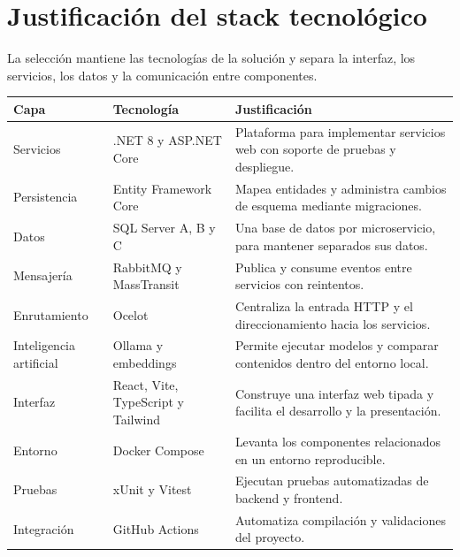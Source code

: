 \section{Justificación del stack tecnológico}
La selección mantiene las tecnologías de la solución y separa la interfaz, los servicios, los datos y la comunicación entre componentes.

\begin{tabularx}{\textwidth}{|p{}|p{}|X|}\hline
\rowcolor{grisTarjeta}\textbf{Capa} & \textbf{Tecnología} & \textbf{Justificación}\\\hline
Servicios & .NET 8 y ASP.NET Core & Plataforma para implementar servicios web con soporte de pruebas y despliegue.\\\hline
Persistencia & Entity Framework Core & Mapea entidades y administra cambios de esquema mediante migraciones.\\\hline
Datos & SQL Server A, B y C & Una base de datos por microservicio, para mantener separados sus datos.\\\hline
Mensajería & RabbitMQ y MassTransit & Publica y consume eventos entre servicios con reintentos.\\\hline
Enrutamiento & Ocelot & Centraliza la entrada HTTP y el direccionamiento hacia los servicios.\\\hline
Inteligencia artificial & Ollama y embeddings & Permite ejecutar modelos y comparar contenidos dentro del entorno local.\\\hline
Interfaz & React, Vite, TypeScript y Tailwind & Construye una interfaz web tipada y facilita el desarrollo y la presentación.\\\hline
Entorno & Docker Compose & Levanta los componentes relacionados en un entorno reproducible.\\\hline
Pruebas & xUnit y Vitest & Ejecutan pruebas automatizadas de backend y frontend.\\\hline
Integración & GitHub Actions & Automatiza compilación y validaciones del proyecto.\\\hline
\end{tabularx}
